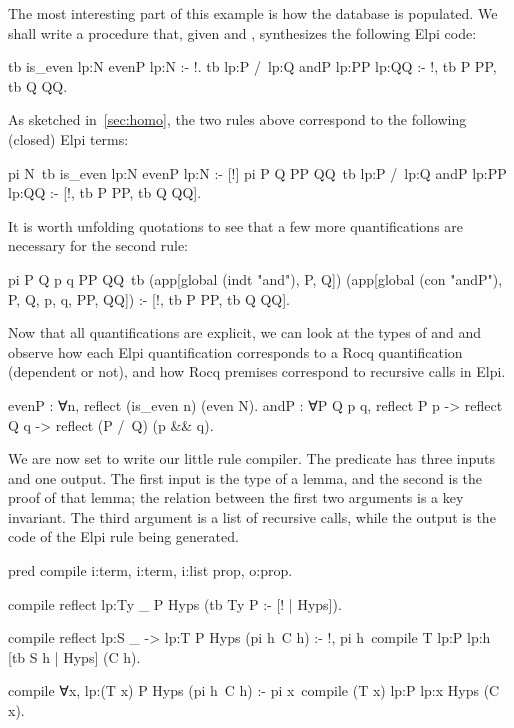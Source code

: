 \documentclass{these-ISSS}
\newenvironment{elpicode}
  {\VerbatimEnvironment\begin{elpibox}\begin{xelpicode}}{\end{xelpicode}
\end{elpibox}}
\newenvironment{rocqcode}
  {\VerbatimEnvironment\begin{rocqbox}\begin{xrocqcode}}{\end{xrocqcode}
\end{rocqbox}}
\begin{document}
The most interesting part of this example is how the database is populated.
We shall write a  procedure that, given  and
, synthesizes the following Elpi code:

\begin{elpicode}
tb {{ is_even lp:N }} {{ evenP lp:N }} :- !.
tb {{ lp:P /\ lp:Q }} {{ andP lp:PP lp:QQ }} :- !, tb P PP, tb Q QQ.
\end{elpicode}


As sketched in~\cref{sec:homo}, the two rules above correspond to the
following (closed) Elpi terms:

\begin{elpicode}
pi N\ tb {{ is_even lp:N }} {{ evenP lp:N }} :- [!]
pi P Q PP QQ\ tb {{ lp:P /\ lp:Q }} {{ andP lp:PP lp:QQ }} :-
  [!, tb P PP, tb Q QQ].
\end{elpicode}


It is worth unfolding quotations to see that a few more quantifications are
necessary for the second rule:

\begin{elpicode}
pi P Q p q PP QQ\
  tb (app[global (indt "and"), P, Q])
     (app[global (con "andP"), P, Q, p, q, PP, QQ]) :-
  [!, tb P PP, tb Q QQ].
\end{elpicode}
  


Now that all quantifications are explicit, we can look at the types of
\rocq{evenP} and \rocq{andP} and observe how each \elpi{pi} Elpi
quantification corresponds to a Rocq quantification (dependent or not), and
how Rocq premises correspond to recursive calls in Elpi.

\begin{rocqcode}
evenP : ∀n, reflect (is_even n) (even N).
andP : ∀P Q p q,
  reflect P p -> reflect Q q -> reflect (P /\ Q) (p && q).
\end{rocqcode}

We are now set to write our little rule compiler.
The  predicate has three inputs and one output. The first input
is the type of a lemma, and the second is the proof of that lemma; the
relation between the first two arguments is a key invariant. The third
argument is a list of recursive calls, while the output is the code of the
Elpi rule being generated.

\begin{elpicode}
pred compile i:term, i:term, i:list prop, o:prop.

compile {{ reflect lp:Ty _ }} P Hyps (tb Ty P :- [! | Hyps]).

compile {{ reflect lp:S _ -> lp:T }} P Hyps (pi h\ C h) :- !,
  pi h\ compile T {{ lp:P lp:h }} [tb S h | Hyps] (C h).

compile {{ ∀x, lp:(T x) }} P Hyps (pi h\ C h) :-
  pi x\ compile (T x) {{ lp:P lp:x }} Hyps (C x).
\end{elpicode}
\end{document}
